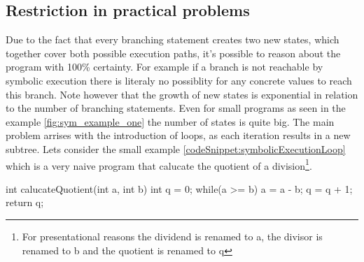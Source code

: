 \subsection{Restriction in practical problems}
Due to the fact that every branching statement creates two new states, which together cover both possible execution paths, it's possible to reason about the program with 100\% certainty. For example if a branch is not reachable by symbolic execution there is literaly no possiblity for any concrete values to reach this branch. Note however that the growth of new states is exponential in relation to the number of branching statements. Even for small programs as seen in the example \ref{fig:sym_example_one} the number of states is quite big. The main problem arrises with the introduction of loops, as each iteration results in a new subtree. Lets consider the small example \ref{codeSnippet:symbolicExecutionLoop} which is a very naive program that calucate the quotient of a division\footnote{For presentational reasons the dividend is renamed to a, the divisor is renamed to b and the quotient is renamed to q}.
\begin{codesnippet}[caption={Symbolic Execution Looping}, label={codeSnippet:symbolicExecutionLoop}]
int calucateQuotient(int a, int b){
   int q = 0;
   while(a >= b){
     a = a - b;
     q = q + 1;
   }
   return q;
}
\end{codesnippet}
